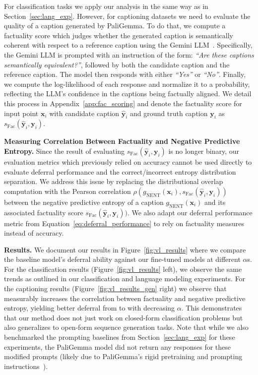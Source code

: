 For classification tasks we apply our analysis in the same way as in Section~\ref{sec:lang_exp}. However, for captioning datasets we need to evaluate the quality of a caption generated by PaliGemma. To do that, we compute a factuality score which judges whether the generated caption is semantically coherent with respect to a reference caption using the Gemini LLM~\citep{team2023gemini}. Specifically, the Gemini LLM is prompted with an instruction of the form: \emph{``Are these captions semantically equivalent?''}, followed by both the candidate caption and the reference caption. The model then responds with either \emph{``Yes''} or \emph{``No''}. Finally, we compute the log-likelihood of each response and normalize it to a probability, reflecting the LLM's confidence in the captions being factually aligned. We detail this process in Appendix~\ref{app:fac_scoring} and denote the factuality score for input point $\mathbf{x}_i$ with candidate caption $\hat{\mathbf{y}}_i$ and ground truth caption $\mathbf{y}_i$ as $s_{\text{Fac}}(\hat{\mathbf{y}}_i, \mathbf{y}_i)$.


\textbf{Measuring Correlation Between Factuality and Negative Predictive Entropy.} Since the result of evaluating $s_{\text{Fac}}(\hat{\mathbf{y}}_i, \mathbf{y}_i)$ is no longer binary, our evaluation metrics which previously relied on accuracy cannot be used directly to evaluate deferral performance and the correct/incorrect entropy distribution separation. We address this issue by replacing the distributional overlap computation with the Pearson correlation $\rho(g_{\text{NENT}}(\mathbf{x}_i), s_{\text{Fac}}(\hat{\mathbf{y}}_i, \mathbf{y}_i))$ between the negative predictive entropy of a caption $g_{\text{NENT}}(\mathbf{x}_i)$ and its associated factuality score $s_{\text{Fac}}(\hat{\mathbf{y}}_i, \mathbf{y}_i))$. We also adapt our deferral performance metric from Equation~\eqref{eq:deferral_performance} to rely on factuality measures instead of accuracy. 


\textbf{Results.}  We document our results in Figure~\ref{fig:vl_results} where we compare the baseline model's deferral ability against our fine-tuned models at different $\alpha$s. For the classification results (Figure~\ref{fig:vl_results} left), we observe the same trends as outlined in our classification and language modeling experiments. For the captioning results (Figure~\ref{fig:vl_results_gen} right) we observe that \loss measurably increases the correlation between factuality and negative predictive entropy, yielding better deferral from \smallmodel to \bigmodel with decreasing $\alpha$. This demonstrates that our method does not just work on closed-form classification problems but also generalizes to open-form sequence generation tasks. Note that while we also benchmarked the prompting baselines from Section~\ref{sec:lang_exp} for these experiments, the PaliGemma model did not return any responses for these modified prompts (likely due to PaliGemma's rigid pretraining and prompting instructions~\citep{beyer2024paligemma}).

